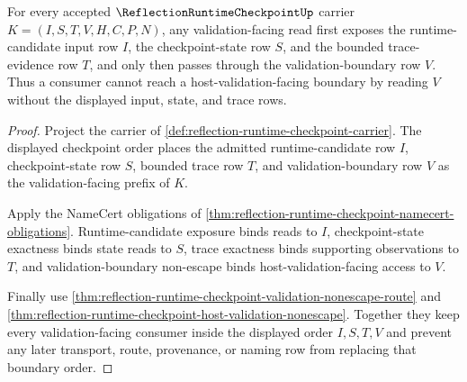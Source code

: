\begin{theorem}
\label{thm:reflection-runtime-checkpoint-validation-boundary-order}
For every accepted $\ReflectionRuntimeCheckpointUp$ carrier $K=(I,S,T,V,H,C,P,N)$, any validation-facing read first exposes the runtime-candidate input row $I$, the checkpoint-state row $S$, and the bounded trace-evidence row $T$, and only then passes through the validation-boundary row $V$. Thus a consumer cannot reach a host-validation-facing boundary by reading $V$ without the displayed input, state, and trace rows.
\end{theorem}
\begin{proof}
Project the carrier of \autoref{def:reflection-runtime-checkpoint-carrier}. The displayed checkpoint order places the admitted runtime-candidate row $I$, checkpoint-state row $S$, bounded trace row $T$, and validation-boundary row $V$ as the validation-facing prefix of $K$.

Apply the NameCert obligations of \autoref{thm:reflection-runtime-checkpoint-namecert-obligations}. Runtime-candidate exposure binds reads to $I$, checkpoint-state exactness binds state reads to $S$, trace exactness binds supporting observations to $T$, and validation-boundary non-escape binds host-validation-facing access to $V$.

Finally use \autoref{thm:reflection-runtime-checkpoint-validation-nonescape-route} and \autoref{thm:reflection-runtime-checkpoint-host-validation-nonescape}. Together they keep every validation-facing consumer inside the displayed order $I,S,T,V$ and prevent any later transport, route, provenance, or naming row from replacing that boundary order.
\end{proof}

